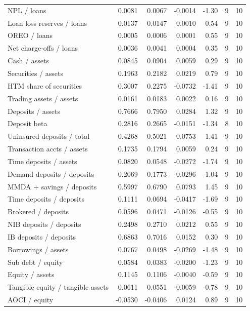 \begin{tabular}{lrrrrrr}
NPL / loans & 0.0081 & 0.0067 & -0.0014 & -1.30 & 9 & 10 \\
Loan loss reserves / loans & 0.0137 & 0.0147 & 0.0010 & 0.54 & 9 & 10 \\
OREO / loans & 0.0005 & 0.0006 & 0.0001 & 0.55 & 9 & 10 \\
Net charge-offs / loans & 0.0036 & 0.0041 & 0.0004 & 0.35 & 9 & 10 \\
Cash / assets & 0.0845 & 0.0904 & 0.0059 & 0.29 & 9 & 10 \\
Securities / assets & 0.1963 & 0.2182 & 0.0219 & 0.79 & 9 & 10 \\
HTM share of securities & 0.3007 & 0.2275 & -0.0732 & -1.41 & 9 & 10 \\
Trading assets / assets & 0.0161 & 0.0183 & 0.0022 & 0.16 & 9 & 10 \\
Deposits / assets & 0.7666 & 0.7950 & 0.0284 & 1.32 & 9 & 10 \\
Deposit beta & 0.2816 & 0.2665 & -0.0151 & -1.34 & 8 & 10 \\
Uninsured deposits / total & 0.4268 & 0.5021 & 0.0753 & 1.41 & 9 & 10 \\
Transaction accts / assets & 0.1735 & 0.1794 & 0.0059 & 0.24 & 9 & 10 \\
Time deposits / assets & 0.0820 & 0.0548 & -0.0272 & -1.74 & 9 & 10 \\
Demand deposits / deposits & 0.2069 & 0.1773 & -0.0296 & -1.04 & 9 & 10 \\
MMDA + savings / deposits & 0.5997 & 0.6790 & 0.0793 & 1.45 & 9 & 10 \\
Time deposits / deposits & 0.1111 & 0.0694 & -0.0417 & -1.69 & 9 & 10 \\
Brokered / deposits & 0.0596 & 0.0471 & -0.0126 & -0.55 & 9 & 10 \\
NIB deposits / deposits & 0.2498 & 0.2710 & 0.0212 & 0.55 & 9 & 10 \\
IB deposits / deposits & 0.6863 & 0.7016 & 0.0152 & 0.30 & 9 & 10 \\
Borrowings / assets & 0.0767 & 0.0498 & -0.0269 & -1.48 & 9 & 10 \\
Sub debt / equity & 0.0584 & 0.0383 & -0.0200 & -1.23 & 9 & 10 \\
Equity / assets & 0.1145 & 0.1106 & -0.0040 & -0.59 & 9 & 10 \\
Tangible equity / tangible assets & 0.0611 & 0.0551 & -0.0059 & -0.78 & 9 & 10 \\
AOCI / equity & -0.0530 & -0.0406 & 0.0124 & 0.89 & 9 & 10 \\

\end{tabular}
